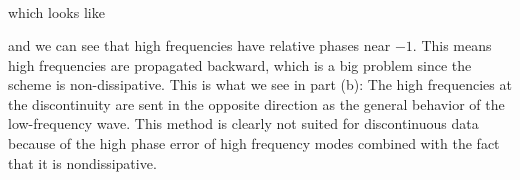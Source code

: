 \documentclass{article} %
\theoremstyle{plain}
\numberwithin{equation}{section} %
\numberwithin{figure}{section} %
\numberwithin{table}{section} %
\begin{document}
\begin{enumerate}[\ \ (a)]
\begin{align*}
        \end{align*}
        which looks like
        \begin{figure}[ht!]
            \centering
        \end{figure}
        \FloatBarrier
        and we can see that high frequencies have relative phases near $-1$.  This means high frequencies are propagated backward, which is a big problem since the scheme is non-dissipative.  This is what we see in part (b): The high frequencies at the discontinuity are sent in the opposite direction as the general behavior of the low-frequency wave.  This method is clearly not suited for discontinuous data because of the high phase error of high frequency modes combined with the fact that it is nondissipative.

\end{enumerate}
\end{document}
